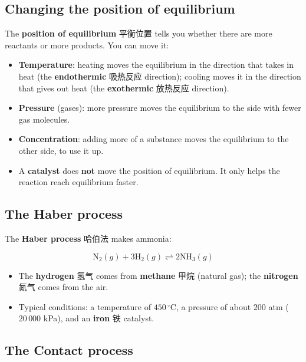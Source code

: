 \documentclass[11pt]{article}
\begin{document}
\subsection*{Changing the position of equilibrium}

The \textbf{position of equilibrium} 平衡位置 tells you whether there are more reactants or more products. You can move it:

\begin{itemize}
\item \textbf{Temperature}: heating moves the equilibrium in the direction that takes in heat (the \textbf{endothermic} 吸热反应 direction); cooling moves it in the direction that gives out heat (the \textbf{exothermic} 放热反应 direction).

\item \textbf{Pressure} (gases): more pressure moves the equilibrium to the side with fewer gas molecules.

\item \textbf{Concentration}: adding more of a substance moves the equilibrium to the other side, to use it up.

\item A \textbf{catalyst} does \textbf{not} move the position of equilibrium. It only helps the reaction reach equilibrium faster.

\end{itemize}

\subsection*{The Haber process}

The \textbf{Haber process} 哈伯法 makes ammonia:

\[
\text{N}_2(g) + 3\text{H}_2(g) \rightleftharpoons 2\text{NH}_3(g)
\]

\begin{itemize}
\item The \textbf{hydrogen} 氢气 comes from \textbf{methane} 甲烷 (natural gas); the \textbf{nitrogen} 氮气 comes from the air.

\item Typical conditions: a temperature of $450\,^{\circ}\text{C}$, a pressure of about $200$ atm ($20\,000$ kPa), and an \textbf{iron} 铁 catalyst.

\end{itemize}

\subsection*{The Contact process}
\end{document}
